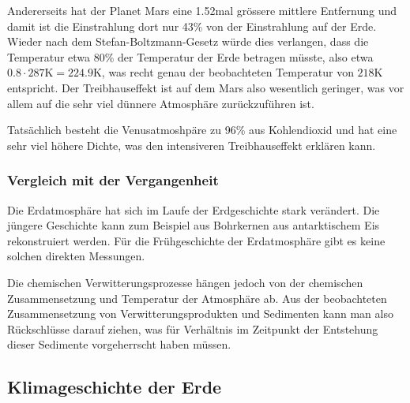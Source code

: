 Andererseits hat der Planet Mars eine 1.52mal grössere mittlere
Entfernung und damit ist die Einstrahlung dort nur 43\% von der
Einstrahlung auf der Erde.
Wieder nach dem Stefan-Boltzmann-Gesetz würde dies verlangen, dass die
Temperatur etwa 80\% der Temperatur der Erde betragen müsste,
also etwa $0.8\cdot 287\text{K} = 224.9\text{K}$, was recht genau
der beobachteten Temperatur von $218\text{K}$ entspricht.
Der Treibhauseffekt ist auf dem Mars also wesentlich geringer, was
vor allem auf die sehr viel dünnere Atmosphäre zurückzuführen ist.

Tatsächlich besteht die Venusatmoshpäre zu 96\% aus Kohlendioxid und
hat eine sehr viel höhere Dichte, was den intensiveren Treibhauseffekt
erklären kann.

\subsubsection{Vergleich mit der Vergangenheit}
Die Erdatmosphäre hat sich im Laufe der Erdgeschichte stark verändert.
Die jüngere Geschichte kann zum Beispiel aus Bohrkernen aus antarktischem
Eis rekonstruiert werden.
Für die Frühgeschichte der Erdatmosphäre gibt es keine solchen direkten
Messungen.

Die chemischen Verwitterungsprozesse hängen jedoch von der chemischen
Zusammensetzung und Temperatur der Atmosphäre ab.
Aus der beobachteten Zusammensetzung von Verwitterungsprodukten und
Sedimenten kann man also Rückschlüsse darauf ziehen, was für Verhältnis
im Zeitpunkt der Entstehung dieser Sedimente vorgeherrscht haben müssen.

\subsection{Klimageschichte der Erde}


